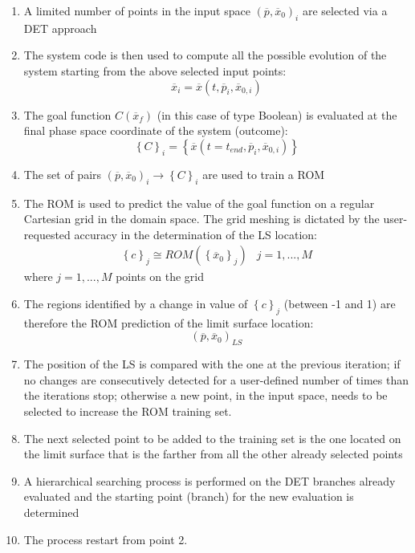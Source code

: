 \begin{enumerate} 
\item A limited number of points in the input space $\left ( \overline{p},\overline{x}_{0} \right )_{i}$ are selected via a DET approach
\item The system code is then used to compute all the possible evolution of the system starting from the above selected input points:
\begin{equation}
    \overline{x}_{i}=\overline{x}\left (t,\overline{p}_{i},\overline{x}_{0,i}  \right )
\end{equation}
\item The goal function  $C\left (\overline{x}_{f}\right )$ (in this case of type Boolean) is evaluated at the final phase space coordinate of the system (outcome): 
\begin{equation}
 \left \{ C \right \}_{i}=\left \{ \overline{x} \left (  t=t_{end},\overline{p}_{i},\overline{x}_{0,i}\right )\right \}
\end{equation}
\item The set of pairs $\left ( \overline{p},\overline{x}_{0} \right )_{i} \rightarrow \left \{ C \right \}_{i}$ are used to train a ROM
\item The ROM is used to predict the value of the goal function on a regular Cartesian grid  in the domain space. The grid meshing is dictated by the user-requested accuracy in the determination of the LS location:
\begin{equation}
 \begin{matrix}
 \left \{ c \right \}_{j} \cong ROM\left ( \left \{ \overline{x}_{0} \right \}_{j} \right ) & j=1,...,M
\end{matrix}
\end{equation}
where $j=1, ..., M$ points on the grid 
\item The regions identified by a change in value of $\left \{ c \right \}_{j}$ (between -1 and 1) are therefore the ROM prediction of the limit surface location:
\begin{equation}
(\overline{p},\overline{x}_{0})_{LS}
\end{equation}
\item The position of the LS is compared with the one at the previous iteration; if no changes are consecutively detected for a user-defined number of times than the iterations stop; otherwise a new point, in the input space, needs to be selected to increase the ROM training set.
\item The next selected point to be added to the training set is the one located on the limit surface that is the farther from all the other already selected points
\item A hierarchical searching process is performed on the DET branches already evaluated and the starting point (branch) for the new evaluation is determined
\item The process restart from point 2.
\end{enumerate}
